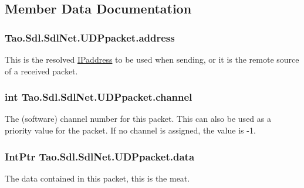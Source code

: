 \subsection{Member Data Documentation}
\hypertarget{struct_tao_1_1_sdl_1_1_sdl_net_1_1_u_d_ppacket_ad8f7cf3905cad9fafa81c9137cf4b813}{
\subsubsection[{address}]{ {\bf Tao.Sdl.SdlNet.UDPpacket.address}}}
\label{struct_tao_1_1_sdl_1_1_sdl_net_1_1_u_d_ppacket_ad8f7cf3905cad9fafa81c9137cf4b813}


This is the resolved \hyperlink{struct_tao_1_1_sdl_1_1_sdl_net_1_1_i_paddress}{IPaddress} to be used when sending, or it is the remote source of a received packet. 

\hypertarget{struct_tao_1_1_sdl_1_1_sdl_net_1_1_u_d_ppacket_ae1e8e37eafd7a1cf8519099cf3aa24f9}{
\subsubsection[{channel}]{\setlength{\rightskip}{0pt plus 5cm}int {\bf Tao.Sdl.SdlNet.UDPpacket.channel}}}
\label{struct_tao_1_1_sdl_1_1_sdl_net_1_1_u_d_ppacket_ae1e8e37eafd7a1cf8519099cf3aa24f9}


The (software) channel number for this packet. This can also be used as a priority value for the packet. If no channel is assigned, the value is -\/1. 

\hypertarget{struct_tao_1_1_sdl_1_1_sdl_net_1_1_u_d_ppacket_a98fa7fe74e6b6e9eee3aa91c56151734}{
\subsubsection[{data}]{\setlength{\rightskip}{0pt plus 5cm}IntPtr {\bf Tao.Sdl.SdlNet.UDPpacket.data}}}
\label{struct_tao_1_1_sdl_1_1_sdl_net_1_1_u_d_ppacket_a98fa7fe74e6b6e9eee3aa91c56151734}


The data contained in this packet, this is the meat. 

